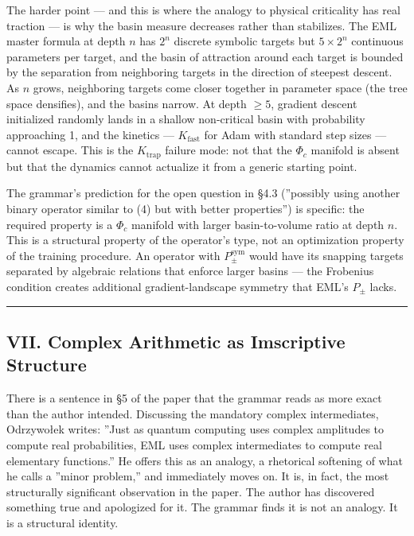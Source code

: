 \documentclass[12pt,a4paper]{article}
\newcommand{\pilcrow}{\S}
\begin{document}
The harder point --- and this is where the analogy to physical criticality has real
traction --- is why the basin measure decreases rather than stabilizes. The EML
master formula at depth $n$ has $2^n$ discrete symbolic targets but $5 \times
2^n$ continuous parameters per target, and the basin of attraction around each
target is bounded by the separation from neighboring targets in the direction of
steepest descent. As $n$ grows, neighboring targets come closer together in
parameter space (the tree space densifies), and the basins narrow. At depth $\geq 5$,
gradient descent initialized randomly lands in a shallow non-critical basin with
probability approaching 1, and the kinetics --- $K_\text{fast}$ for Adam with
standard step sizes --- cannot escape. This is the $K_\text{trap}$ failure mode:
not that the $\Phi_c$ manifold is absent but that the dynamics cannot actualize
it from a generic starting point.

The grammar's prediction for the open question in \pilcrow{}4.3 (''possibly using another
binary operator similar to (4) but with better properties'') is specific: the
required property is a $\Phi_c$ manifold with larger basin-to-volume ratio at
depth $n$. This is a structural property of the operator's type, not an
optimization property of the training procedure. An operator with
$P_{\pm}^{\text{sym}}$ would have its snapping targets separated by algebraic
relations that enforce larger basins --- the Frobenius condition creates additional
gradient-landscape symmetry that EML's $P_{\pm}$ lacks.

\begin{center}
\rule{0.5\textwidth}{0.4pt}
\end{center}

\subsection{VII. Complex Arithmetic as Imscriptive Structure}

There is a sentence in \pilcrow{}5 of the paper that the grammar reads as more exact than
the author intended. Discussing the mandatory complex intermediates, Odrzywołek
writes: ''Just as quantum computing uses complex amplitudes to compute real
probabilities, EML uses complex intermediates to compute real elementary
functions.'' He offers this as an analogy, a rhetorical softening of what he calls
a ''minor problem,'' and immediately moves on. It is, in fact, the most
structurally significant observation in the paper. The author has discovered
something true and apologized for it. The grammar finds it is not an analogy.
It is a structural identity.
\end{document}
